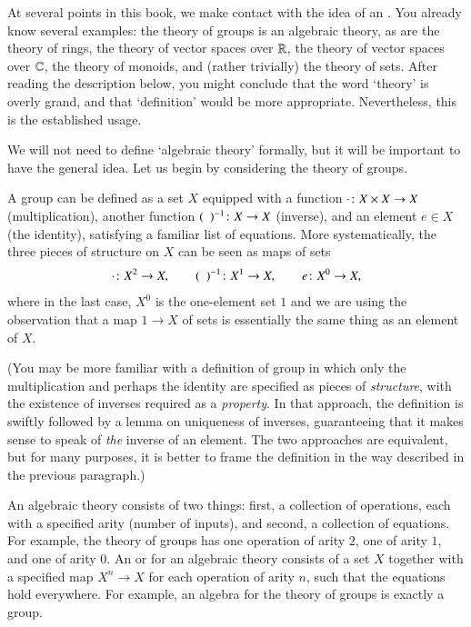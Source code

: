 \begin{remark}  
\label{rmk:alg-thy}
At several points in this book, we make contact with the idea of an
.  You already know several examples: the theory of groups is an
algebraic theory, as are the theory of rings, the theory of vector spaces
over $\mathbb{R}$, the theory of vector spaces over $\mathbb{C}$, the theory of
monoids, and (rather trivially) the theory of sets.  After reading the
description below, you might conclude that the word `theory' is overly
grand, and that `definition' would be more appropriate.  Nevertheless, this
is the established usage.

We will not need to define `algebraic theory' formally, but it will be
important to have the general idea.  Let us begin by considering the theory
of groups.

A group can be defined as a set $X$ equipped with a function $\cdot \from X
\times X \to X$ (multiplication), another function $\blank^{-1}\from X \to
X$ (inverse), and an element $e \in X$ (the identity), satisfying a
familiar list of equations.  More systematically, the three pieces of
structure on $X$ can be seen as maps of sets
\[
\cdot\from X^2 \to X, 
\qquad
\blank^{-1}\from X^1 \to X,
\qquad
e\from X^0 \to X,
\]
where in the last case, $X^0$ is the one-element set $1$ and we are using
the observation that a map $1 \to X$ of sets is essentially the same thing
as an element of $X$.

(You may be more familiar with a definition of group in which only the
multiplication and perhaps the identity are specified as pieces of
\emph{structure}, with the existence of inverses required as a
\emph{property}.  In that approach, the definition is swiftly followed by a
lemma on uniqueness of inverses, guaranteeing that it makes sense to speak
of \emph{the} inverse of an element.  The two approaches are equivalent,
but for many purposes, it is better to frame the definition in the way
described in the previous paragraph.) 

An algebraic theory consists of two things: first, a collection of
operations, each with a specified arity%
%
%
(number of inputs), and second, a collection of equations.  For example,
the theory of groups has one operation of arity $2$, one of arity $1$, and
one of arity $0$.  An %
%
%
or %
%
%
for an algebraic theory consists of a set $X$ together with a specified map
$X^n \to X$ for each operation of arity $n$, such that the equations hold
everywhere.  For example, an algebra for the theory of groups is exactly a
group.


\end{remark}
